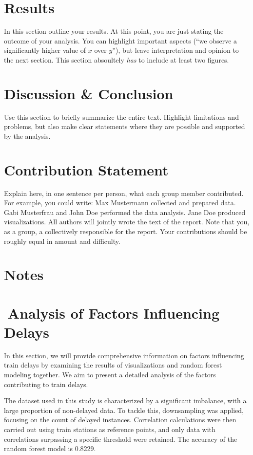 \documentclass{article}
\theoremstyle{plain}
\theoremstyle{definition}
\theoremstyle{remark}
\begin{document}
\section{Results}\label{sec:results}

In this section outline your results. At this point, you are just stating the outcome of your analysis. You can highlight important aspects (``we observe a significantly higher value of $x$ over $y$''), but leave interpretation and opinion to the next section. This section absoultely \emph{has} to include at least two figures.

\section{Discussion \& Conclusion}\label{sec:conclusion}

Use this section to briefly summarize the entire text. Highlight limitations and problems, but also make clear statements where they are possible and supported by the analysis. 

\section*{Contribution Statement}

Explain here, in one sentence per person, what each group member contributed. For example, you could write: Max Mustermann collected and prepared data. Gabi Musterfrau and John Doe performed the data analysis. Jane Doe produced visualizations. All authors will jointly wrote the text of the report. Note that you, as a group, a collectively responsible for the report. Your contributions should be roughly equal in amount and difficulty.

\section*{Notes} 

\section{Analysis of Factors Influencing Delays}

In this section, we will provide comprehensive information on factors influencing train delays by examining the results of visualizations and random forest modeling together. We aim to present a detailed analysis of the factors contributing to train delays.

The dataset used in this study is characterized by a significant imbalance, with a large proportion of non-delayed data. To tackle this, downsampling was applied, focusing on the count of delayed instances. Correlation calculations were then carried out using train stations as reference points, and only data with correlations surpassing a specific threshold were retained. The accuracy of the random forest model is 0.8229.
\end{document}
